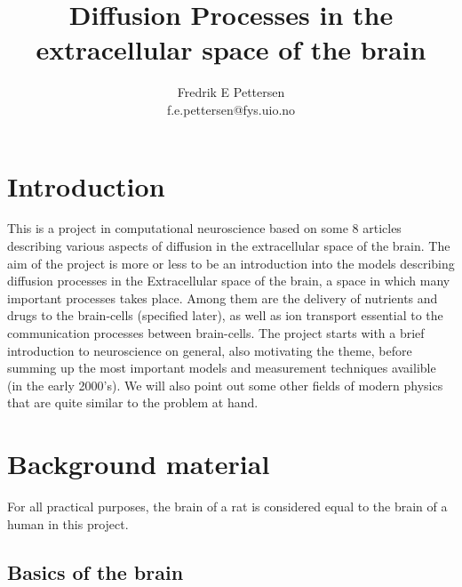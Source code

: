 \documentclass[a4paper,english, 12pt, twoside]{article}
\title{Diffusion Processes in the extracellular space of the brain}
\author{Fredrik E Pettersen\\ f.e.pettersen@fys.uio.no}
\begin{document}
\maketitle

% 
\tableofcontents
\newpage
\section{Introduction}
This is a project in computational neuroscience based on some 8 articles describing various aspects of diffusion in the extracellular space of the brain. 
The aim of the project is more or less to be an introduction into the models describing diffusion processes in the Extracellular space of the brain, a space in which many important processes takes place. 
Among them are the delivery of nutrients and drugs to the brain-cells (specified later), as well as ion transport essential to the communication processes between brain-cells. 
The project starts with a brief introduction to neuroscience on general, also motivating the theme, before summing up the most important models and measurement techniques availible (in the early 2000's). 
We will also point out some other fields of modern physics that are quite similar to the problem at hand.

\section{Background material}
For all practical purposes, the brain of a rat is considered equal to the brain of a human in this project.
\subsection{Basics of the brain}
\end{document}
